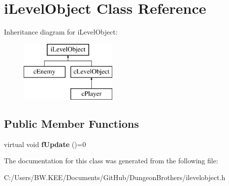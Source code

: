 \hypertarget{classi_level_object}{\section{i\-Level\-Object Class Reference}
\label{classi_level_object}
}
Inheritance diagram for i\-Level\-Object\-:\begin{figure}[H]
\begin{center}
\leavevmode
\includegraphics[height=3.000000cm]{classi_level_object}
\end{center}
\end{figure}
\subsection*{Public Member Functions}
\begin{DoxyCompactItemize}
\item 
\hypertarget{classi_level_object_a32b7a14285e0aa57eac94ab37bb0a7f1}{virtual void {\bfseries f\-Update} ()=0}\label{classi_level_object_a32b7a14285e0aa57eac94ab37bb0a7f1}

\end{DoxyCompactItemize}


The documentation for this class was generated from the following file\-:\begin{DoxyCompactItemize}
\item 
C\-:/\-Users/\-B\-W.\-K\-E\-E/\-Documents/\-Git\-Hub/\-Dungeon\-Brothers/ilevelobject.\-h\end{DoxyCompactItemize}
